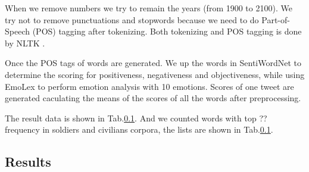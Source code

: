 When we remove numbers we try to remain the years (from 1900 to 2100).
We try not to remove punctuations and stopwords because we need to do Part-of-Speech (POS) tagging after tokenizing. Both tokenizing and POS tagging is done by NLTK \citep{NLTK}.

Once the POS tags of words are generated. We up the words in SentiWordNet to determine the scoring for positiveness, negativeness and objectiveness, while using EmoLex to perform emotion analysis with 10 emotions. Scores of one tweet are generated caculating the means of the scores of all the words after preprocessing.

The result data is shown in Tab.\ref{}. And we counted words with top ?? frequency in soldiers and civilians corpora, the lists are shown in Tab.\ref{}.

\subsection{Results}

